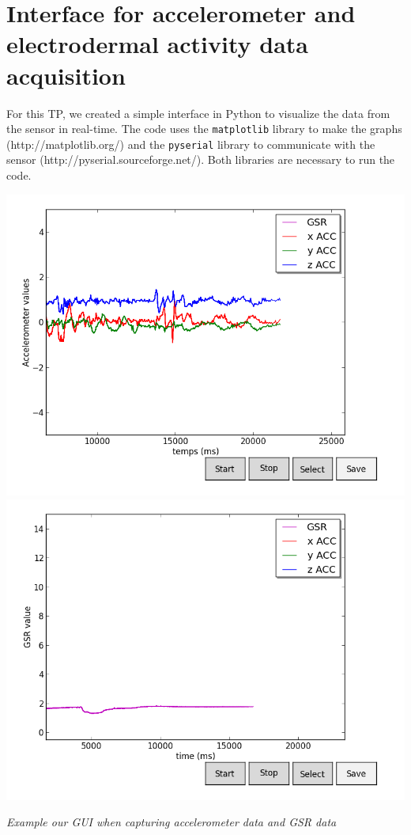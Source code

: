 \documentclass[12pt,a4paper]{article}
\begin{document}
\clearpage
\section{Interface for accelerometer and electrodermal activity 
 data acquisition}

For this TP, we created a simple interface in Python to visualize the data from the sensor in real-time. The code uses the \texttt{matplotlib} library to make the graphs (http://matplotlib.org/) and the \texttt{pyserial} library to communicate with the sensor (http://pyserial.sourceforge.net/). Both libraries are necessary to run the code. 

\begin{center}
\includegraphics[scale=0.3]{figSav_ACC.png}
\includegraphics[scale=0.3]{figSav_GSR.png}

\textit{Example our GUI when capturing accelerometer data and GSR data}
\end{center}
\end{document}
